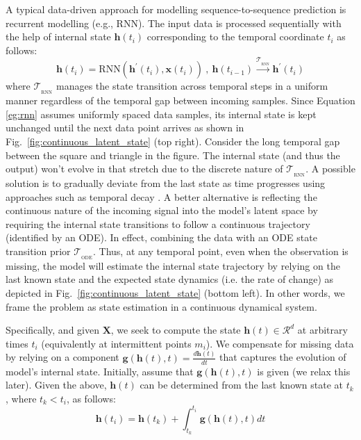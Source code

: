 \documentclass[10pt, conference, compsocconf]{IEEEtran}
\def\update#1{#1}
\begin{document}
A typical data-driven approach for modelling sequence-to-sequence prediction is recurrent modelling (e.g., RNN). The input data is processed sequentially with the help of internal state $\mathbf{h}(t_i)$ corresponding to the temporal coordinate $t_i$ as follows:
\begin{equation}
 \mathbf{h}(t_{i}) = \text{RNN}(\mathbf{h}^{\prime}(t_i),  \mathbf{x}(t_i)) \ , \ \mathbf{h}(t_{i-1}) \xrightarrow{\mathcal{T}_{{}_\text{RNN}}}  \mathbf{h}^{\prime}(t_i) 
 \label{eg:rnn}
\end{equation}
where $\mathcal{T}_{{}_\text{RNN}}$ manages the state transition across temporal steps in a uniform manner regardless of the temporal gap between incoming samples. Since Equation \eqref{eg:rnn} assumes uniformly spaced data samples, its internal state is kept unchanged until the next data point arrives
as shown in Fig.~\ref{fig:continuous_latent_state} (\update{top} right). Consider the long temporal gap between the square and triangle in the figure. The internal state (and thus the output) won't evolve in that stretch due to the discrete nature of $\mathcal{T}_{{}_\text{RNN}}$. 
A possible solution is to gradually deviate from the last state as time progresses using approaches such as temporal decay \cite{rajkomar2018scalable}. A better alternative is reflecting the continuous nature of the incoming signal into the model's latent space by requiring the internal state transitions to follow a continuous trajectory (identified by an ODE). In effect, combining the data with an ODE state transition prior $\mathcal{T}_{{}_\text{ODE}}$. Thus, at any temporal point, even when the observation is missing,  the model will estimate the internal state trajectory by relying on the last known state 
and the expected state dynamics (i.e. the rate of change) as depicted in Fig.~\ref{fig:continuous_latent_state} (bottom left). In other words, we frame the problem as state estimation in a continuous dynamical system. 


Specifically, and given $\mathbf{X}$,  we seek to compute the state $\mathbf{h}(t) \in \mathcal{R}^{d}$ at arbitrary times $t_i$ (equivalently at intermittent points $m_i$).  We compensate for missing data by relying on a component $\mathbf{g}(\mathbf{h}(t), t) = \frac{d\mathbf{h}(t)}{dt}$ that captures the evolution of model's internal state. 
Initially, assume that $\mathbf{g}(\mathbf{h}(t), t)$ is given (we relax this later).
Given the above, $ \mathbf{h}(t)$ can be determined from the last known state at $t_k$, where $t_k<t_i$,  as follows:
\begin{equation}
\mathbf{h}(t_i) = \mathbf{h}(t_k) + \int_{t_k}^{t_i}  \mathbf{g}(\mathbf{h}(t), t) dt
\label{eq:ivp}
\end{equation}
\end{document}
